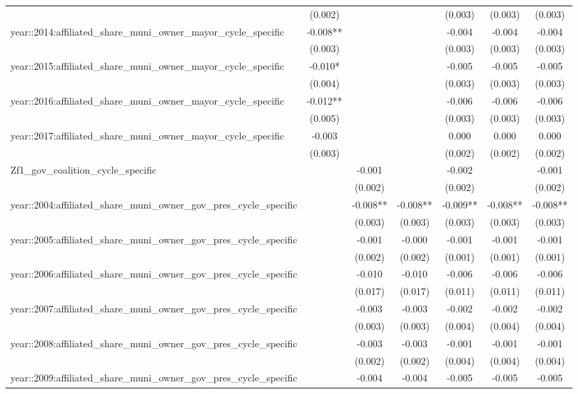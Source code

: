 {\begin{tabular}[t]{lcccccc}
 & (0.002) &  &  & (0.003) & (0.003) & (0.003)\\
year::2014:affiliated_share_muni_owner_mayor_cycle_specific & -0.008** &  &  & -0.004 & -0.004 & -0.004\\
 & (0.003) &  &  & (0.003) & (0.003) & (0.003)\\
year::2015:affiliated_share_muni_owner_mayor_cycle_specific & -0.010* &  &  & -0.005 & -0.005 & -0.005\\
 & (0.004) &  &  & (0.003) & (0.003) & (0.003)\\
year::2016:affiliated_share_muni_owner_mayor_cycle_specific & -0.012** &  &  & -0.006 & -0.006 & -0.006\\
 & (0.005) &  &  & (0.003) & (0.003) & (0.003)\\
year::2017:affiliated_share_muni_owner_mayor_cycle_specific & -0.003 &  &  & 0.000 & 0.000 & 0.000\\
 & (0.003) &  &  & (0.002) & (0.002) & (0.002)\\
Zf1_gov_coalition_cycle_specific &  & -0.001 &  & -0.002 &  & -0.001\\
 &  & (0.002) &  & (0.002) &  & (0.002)\\
year::2004:affiliated_share_muni_owner_gov_pres_cycle_specific &  & -0.008** & -0.008** & -0.009** & -0.008** & -0.008**\\
 &  & (0.003) & (0.003) & (0.003) & (0.003) & (0.003)\\
year::2005:affiliated_share_muni_owner_gov_pres_cycle_specific &  & -0.001 & -0.000 & -0.001 & -0.001 & -0.001\\
 &  & (0.002) & (0.002) & (0.001) & (0.001) & (0.001)\\
year::2006:affiliated_share_muni_owner_gov_pres_cycle_specific &  & -0.010 & -0.010 & -0.006 & -0.006 & -0.006\\
 &  & (0.017) & (0.017) & (0.011) & (0.011) & (0.011)\\
year::2007:affiliated_share_muni_owner_gov_pres_cycle_specific &  & -0.003 & -0.003 & -0.002 & -0.002 & -0.002\\
 &  & (0.003) & (0.003) & (0.004) & (0.004) & (0.004)\\
year::2008:affiliated_share_muni_owner_gov_pres_cycle_specific &  & -0.003 & -0.003 & -0.001 & -0.001 & -0.001\\
 &  & (0.002) & (0.002) & (0.004) & (0.004) & (0.004)\\
year::2009:affiliated_share_muni_owner_gov_pres_cycle_specific &  & -0.004 & -0.004 & -0.005 & -0.005 & -0.005\\

\end{tabular}}

